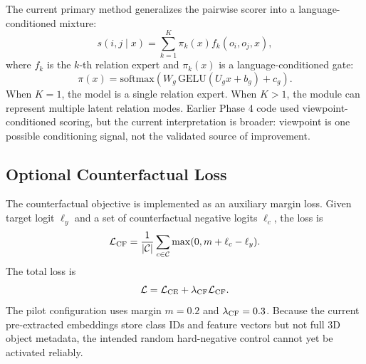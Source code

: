 The current primary method generalizes the pairwise scorer into a language-conditioned mixture:
\begin{equation}
  s(i,j\mid x) = \sum_{k=1}^{K}\pi_k(x) f_k(o_i,o_j,x),
  \label{eq:latent-score}
\end{equation}
where $f_k$ is the $k$-th relation expert and $\pi_k(x)$ is a language-conditioned gate:
\begin{equation}
  \pi(x)=\mathrm{softmax}(W_g\,\mathrm{GELU}(U_gx+b_g)+c_g).
\end{equation}
When $K=1$, the model is a single relation expert. When $K>1$, the module can represent multiple latent relation modes. Earlier Phase 4 code used viewpoint-conditioned scoring, but the current interpretation is broader: viewpoint is one possible conditioning signal, not the validated source of improvement.

\subsection{Optional Counterfactual Loss}

The counterfactual objective is implemented as an auxiliary margin loss. Given target logit $\ell_y$ and a set of counterfactual negative logits $\ell_c$, the loss is
\begin{equation}
  \mathcal{L}_{\mathrm{CF}} =
  \frac{1}{|\mathcal{C}|}
  \sum_{c\in\mathcal{C}}\max(0, m+\ell_c-\ell_y).
\end{equation}
The total loss is
\begin{equation}
  \mathcal{L} = \mathcal{L}_{\mathrm{CE}} + \lambda_{\mathrm{CF}}\mathcal{L}_{\mathrm{CF}}.
\end{equation}
The pilot configuration uses margin $m=0.2$ and $\lambda_{\mathrm{CF}}=0.3$. Because the current pre-extracted embeddings store class IDs and feature vectors but not full 3D object metadata, the intended random hard-negative control cannot yet be activated reliably.
